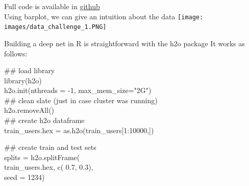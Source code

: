\documentclass{beamer}
\begin{document}
\begin{frame}
Full code is available in 
 \href{https://github.com/ericbenhamou/BayesianNonParametric}{github}
\\
Using barplot, we can give an intuition about the data
\texttt{[image: images/data\_challenge\_1.PNG]} 
\end{frame}


\begin{frame}
Building a deep net in R is straightforward with the h2o package
It works as follows: \\
\bigskip

{\color{applegreen}  \#\# load library } \\
{\color{blue} library}(h2o) \\
h2o.init(nthreads = -1, max\_mem\_size="2G") \\
{\color{applegreen}  \#\# clean slate (just in case cluster was running) } \\
h2o.removeAll() \\
{\color{applegreen}  \#\# create h2o dataframe } \\
train\_users.hex = as.h2o(train\_users[1:10000,]) 

{\color{applegreen}  \#\# create train and test sets} \\
splits = h2o.splitFrame( \\
\hspace{0.5cm}  train\_users.hex,    c({\color{blue} 0.7},{\color{blue} 0.3}), \\
\hspace{0.5cm}  seed = {\color{blue} 1234})   
\end{frame}
\end{document}
